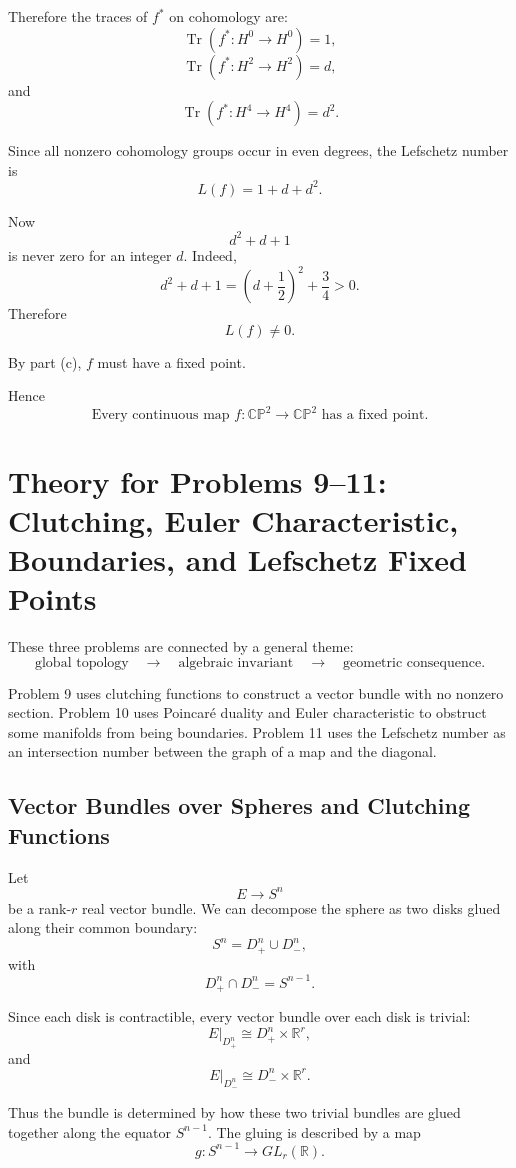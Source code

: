 \documentclass[12pt,a4paper]{article}
\theoremstyle{notespace}
\begin{document}
Therefore the traces of \(f^*\) on cohomology are:
\[
\operatorname{Tr}(f^*:H^0\to H^0)=1,
\]
\[
\operatorname{Tr}(f^*:H^2\to H^2)=d,
\]
and
\[
\operatorname{Tr}(f^*:H^4\to H^4)=d^2.
\]

Since all nonzero cohomology groups occur in even degrees, the Lefschetz number
is
\[
L(f)=1+d+d^2.
\]

Now
\[
d^2+d+1
\]
is never zero for an integer \(d\). Indeed,
\[
d^2+d+1
=
\left(d+\frac12\right)^2+\frac34
>0.
\]
Therefore
\[
L(f)\neq 0.
\]

By part (c), \(f\) must have a fixed point.

Hence
\[
\boxed{
	\text{Every continuous map }
	f:\mathbb{CP}^2\to \mathbb{CP}^2
	\text{ has a fixed point.}
}
\]	
	
\section{Theory for Problems 9--11: Clutching, Euler Characteristic, Boundaries, and Lefschetz Fixed Points}

These three problems are connected by a general theme:
\[
\text{global topology}
\quad\longrightarrow\quad
\text{algebraic invariant}
\quad\longrightarrow\quad
\text{geometric consequence}.
\]

Problem 9 uses clutching functions to construct a vector bundle with no nonzero
section. Problem 10 uses Poincar\'e duality and Euler characteristic to obstruct
some manifolds from being boundaries. Problem 11 uses the Lefschetz number as an
intersection number between the graph of a map and the diagonal.

\subsection{Vector Bundles over Spheres and Clutching Functions}

Let
\[
E\to S^n
\]
be a rank-\(r\) real vector bundle. We can decompose the sphere as two disks
glued along their common boundary:
\[
S^n=D^n_+\cup D^n_-,
\]
with
\[
D^n_+\cap D^n_-=S^{n-1}.
\]

Since each disk is contractible, every vector bundle over each disk is trivial:
\[
E|_{D^n_+}\cong D^n_+\times \mathbb R^r,
\]
and
\[
E|_{D^n_-}\cong D^n_-\times \mathbb R^r.
\]

Thus the bundle is determined by how these two trivial bundles are glued together
along the equator \(S^{n-1}\). The gluing is described by a map
\[
g:S^{n-1}\to GL_r(\mathbb R).
\]
\end{document}
